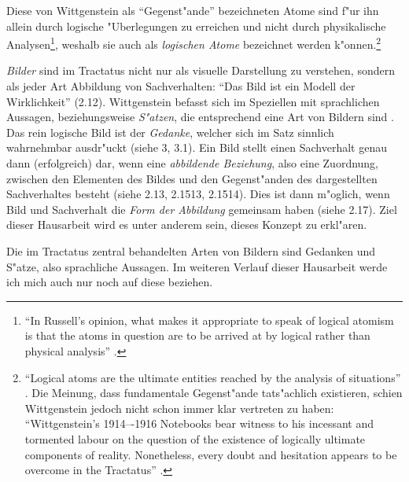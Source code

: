 \documentclass[a4paper, emulatestandardclasses, 12pt]{scrartcl}
\begin{document}
\begin{onehalfspace}
Diese von Wittgenstein als "`Gegenst"ande"' bezeichneten Atome sind f"ur ihn allein durch logische "Uberlegungen zu erreichen und nicht durch physikalische Analysen\footnote{"`In Russell's opinion, what makes it appropriate to speak of logical atomism is that the atoms in question are to be arrived at by logical rather than physical analysis"' \citep{sep-wittgenstein-atomism}.}, weshalb sie auch als \emph{logischen Atome} bezeichnet werden k"onnen.\footnote{"`Logical atoms are the ultimate entities reached by the analysis of situations"' \cite[S. 47]{frascolla2007understanding}. Die Meinung, dass fundamentale Gegenst"ande tats"achlich existieren, schien Wittgenstein jedoch nicht schon immer klar vertreten zu haben: "`Wittgenstein's 1914–-1916 Notebooks bear witness to his incessant and tormented labour on the question of the existence of logically ultimate components of reality. Nonetheless, every doubt and hesitation appears to be overcome in the Tractatus"' \cite[S. 48]{frascolla2007understanding}.} %

\emph{Bilder} sind im Tractatus nicht nur als visuelle Darstellung zu verstehen, sondern als jeder Art Abbildung von Sachverhalten: "`Das Bild ist ein Modell der Wirklichkeit"' (2.12). Wittgenstein befasst sich im Speziellen mit sprachlichen Aussagen, beziehungsweise \emph{S"atzen}, die entsprechend eine Art von Bildern sind \cite[vgl.][S. 66]{mcguinness2002approaches}. Das rein logische Bild ist der \emph{Gedanke}, welcher sich im Satz sinnlich wahrnehmbar ausdr"uckt (siehe 3, 3.1). Ein Bild stellt einen Sachverhalt genau dann (erfolgreich) dar, wenn eine \emph{abbildende Beziehung}, also eine Zuordnung, zwischen den Elementen des Bildes und den Gegenst"anden des dargestellten Sachverhaltes besteht (siehe 2.13, 2.1513, 2.1514). Dies ist dann m"oglich, wenn Bild und Sachverhalt die \emph{Form der Abbildung} gemeinsam haben (siehe 2.17). Ziel dieser Hausarbeit wird es unter anderem sein, dieses Konzept zu erkl"aren. 

Die im Tractatus zentral behandelten Arten von Bildern sind Gedanken und S"atze, also sprachliche Aussagen. Im weiteren Verlauf dieser Hausarbeit werde ich mich auch nur noch auf diese beziehen.



\end{onehalfspace}
\end{document}
